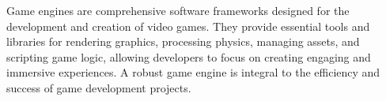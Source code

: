 








%   

















Game engines are comprehensive software frameworks designed for the development and creation of video games. They provide essential tools and libraries for rendering graphics, processing physics, managing assets, and scripting game logic, allowing developers to focus on creating engaging and immersive experiences. A robust game engine is integral to the efficiency and success of game development projects.

